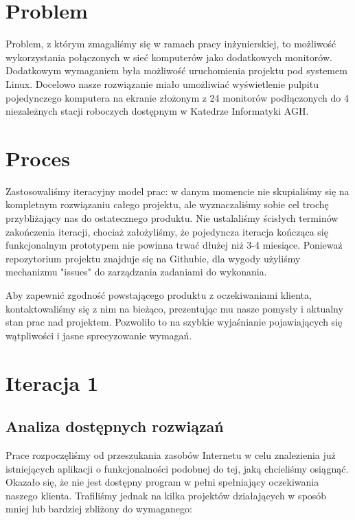 


\maketitle

\tableofcontents
\vfill
\pagebreak

\section{Problem}

Problem, z którym zmagaliśmy się w ramach pracy inżynierskiej, to możliwość wykorzystania połączonych w sieć komputerów jako dodatkowych monitorów. Dodatkowym wymaganiem była możliwość uruchomienia projektu pod systemem Linux. Docelowo nasze rozwiązanie miało umożliwiać wyświetlenie pulpitu pojedynczego komputera na ekranie złożonym z 24 monitorów podłączonych do 4 niezależnych stacji roboczych dostępnym w Katedrze Informatyki AGH.

\section{Proces}

Zastosowaliśmy iteracyjny model prac: w danym momencie nie skupialiśmy się na kompletnym rozwiązaniu całego projektu, ale wyznaczaliśmy sobie cel trochę przybliżający nas do ostatecznego produktu. Nie ustalaliśmy ścisłych terminów zakończenia iteracji, chociaż założyliśmy, że pojedyncza iteracja kończąca się funkcjonalnym prototypem nie powinna trwać dłużej niż 3-4 miesiące. Ponieważ repozytorium projektu znajduje się na Githubie, dla wygody użyliśmy mechanizmu "issues" do zarządzania zadaniami do wykonania.

Aby zapewnić zgodność powstającego produktu z oczekiwaniami klienta, kontaktowaliśmy się z nim na bieżąco, prezentując mu nasze pomysły i aktualny stan prac nad projektem. Pozwoliło to na szybkie wyjaśnianie pojawiających się wątpliwości i jasne sprecyzowanie wymagań.

\section{Iteracja 1}
  \subsection{Analiza dostępnych rozwiązań}
    Prace rozpoczęliśmy od przeszukania zasobów Internetu w celu znalezienia już istniejących aplikacji o funkcjonalności podobnej do tej, jaką chcieliśmy osiągnąć. Okazało się, że nie jest dostępny program w pełni spełniający oczekiwania naszego klienta. Trafiliśmy jednak na kilka projektów działających w sposób mniej lub bardziej zbliżony do wymaganego:

